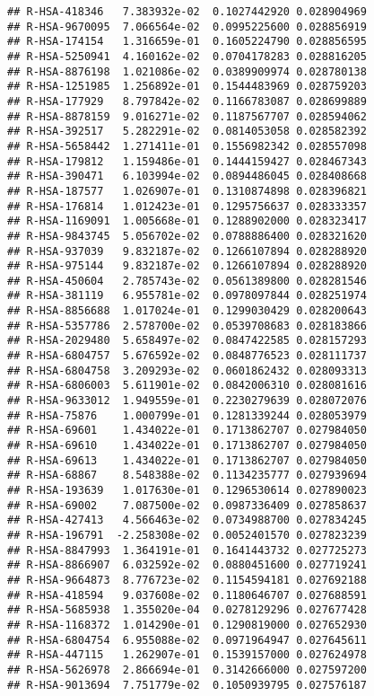 \documentclass[
]{article}
\begin{document}
\begin{verbatim}
## R-HSA-418346   7.383932e-02  0.1027442920 0.028904969
## R-HSA-9670095  7.066564e-02  0.0995225600 0.028856919
## R-HSA-174154   1.316659e-01  0.1605224790 0.028856595
## R-HSA-5250941  4.160162e-02  0.0704178283 0.028816205
## R-HSA-8876198  1.021086e-02  0.0389909974 0.028780138
## R-HSA-1251985  1.256892e-01  0.1544483969 0.028759203
## R-HSA-177929   8.797842e-02  0.1166783087 0.028699889
## R-HSA-8878159  9.016271e-02  0.1187567707 0.028594062
## R-HSA-392517   5.282291e-02  0.0814053058 0.028582392
## R-HSA-5658442  1.271411e-01  0.1556982342 0.028557098
## R-HSA-179812   1.159486e-01  0.1444159427 0.028467343
## R-HSA-390471   6.103994e-02  0.0894486045 0.028408668
## R-HSA-187577   1.026907e-01  0.1310874898 0.028396821
## R-HSA-176814   1.012423e-01  0.1295756637 0.028333357
## R-HSA-1169091  1.005668e-01  0.1288902000 0.028323417
## R-HSA-9843745  5.056702e-02  0.0788886400 0.028321620
## R-HSA-937039   9.832187e-02  0.1266107894 0.028288920
## R-HSA-975144   9.832187e-02  0.1266107894 0.028288920
## R-HSA-450604   2.785743e-02  0.0561389800 0.028281546
## R-HSA-381119   6.955781e-02  0.0978097844 0.028251974
## R-HSA-8856688  1.017024e-01  0.1299030429 0.028200643
## R-HSA-5357786  2.578700e-02  0.0539708683 0.028183866
## R-HSA-2029480  5.658497e-02  0.0847422585 0.028157293
## R-HSA-6804757  5.676592e-02  0.0848776523 0.028111737
## R-HSA-6804758  3.209293e-02  0.0601862432 0.028093313
## R-HSA-6806003  5.611901e-02  0.0842006310 0.028081616
## R-HSA-9633012  1.949559e-01  0.2230279639 0.028072076
## R-HSA-75876    1.000799e-01  0.1281339244 0.028053979
## R-HSA-69601    1.434022e-01  0.1713862707 0.027984050
## R-HSA-69610    1.434022e-01  0.1713862707 0.027984050
## R-HSA-69613    1.434022e-01  0.1713862707 0.027984050
## R-HSA-68867    8.548388e-02  0.1134235777 0.027939694
## R-HSA-193639   1.017630e-01  0.1296530614 0.027890023
## R-HSA-69002    7.087500e-02  0.0987336409 0.027858637
## R-HSA-427413   4.566463e-02  0.0734988700 0.027834245
## R-HSA-196791  -2.258308e-02  0.0052401570 0.027823239
## R-HSA-8847993  1.364191e-01  0.1641443732 0.027725273
## R-HSA-8866907  6.032592e-02  0.0880451600 0.027719241
## R-HSA-9664873  8.776723e-02  0.1154594181 0.027692188
## R-HSA-418594   9.037608e-02  0.1180646707 0.027688591
## R-HSA-5685938  1.355020e-04  0.0278129296 0.027677428
## R-HSA-1168372  1.014290e-01  0.1290819000 0.027652930
## R-HSA-6804754  6.955088e-02  0.0971964947 0.027645611
## R-HSA-447115   1.262907e-01  0.1539157000 0.027624978
## R-HSA-5626978  2.866694e-01  0.3142666000 0.027597200
## R-HSA-9013694  7.751779e-02  0.1050939795 0.027576187

\end{verbatim}
\end{document}
